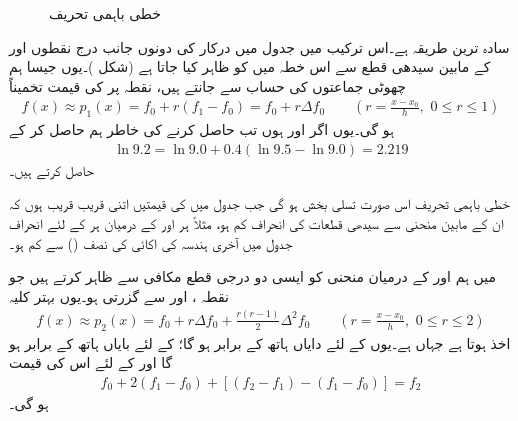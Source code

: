 \begin{figure}
\centering
{}
\caption{خطی باہمی تحریف}
\label{شکل_اعدادی_خطی_باہمی_تحریف}
\end{figure}

سادہ ترین طریقہ  ہے۔اس ترکیب میں جدول میں درکار  کی دونوں جانب درج نقطوں  اور  کے مابین سیدھی قطع سے اس خطہ میں   کو ظاہر کیا جاتا ہے (شکل )۔یوں جیسا ہم چھوٹی جماعتوں کی حساب سے جانتے ہیں، نقطہ  پر  کی قیمت تخمیناً
\begin{align}\label{مساوات_اعدادی_خطی_باہمی_تحریف}
f(x)\approx p_1(x)=f_0+r(f_1-f_0)=f_0+r\Delta f_0\quad \quad (r=\frac{x-x_0}{h},\,\,0\le r\le 1)
\end{align}
ہو گی۔یوں اگر  اور  ہوں تب  حاصل کرنے کی خاطر ہم   حاصل کر کے
\begin{align*}
\ln 9.2=\ln 9.0+0.4(\ln 9.5-\ln 9.0)=2.219
\end{align*}
حاصل کرتے ہیں۔  

خطی باہمی تحریف اس صورت تسلی بخش ہو گی جب جدول میں  کی قیمتیں اتنی قریب قریب ہوں کہ ان کے مابین منحنی سے سیدھی قطعات کی انحراف کم ہو، مثلاً ہر   اور  کے درمیان ہر  کے لئے انحراف جدول میں آخری ہندسہ کی اکائی کی نصف () سے کم ہو۔

 میں ہم  اور  کے درمیان منحنی  کو ایسی دو درجی  قطع مکافی سے ظاہر کرتے ہیں جو نقطہ ،  اور  سے گزرتی ہو۔یوں بہتر کلیہ
\begin{align}\label{مساوات_اعدادی_دو_درجی_باہمی_تحریف}
f(x)\approx p_2(x)=f_0+r\Delta f_0+\frac{r(r-1)}{2}\Delta^2 f_0\quad \quad (r=\frac{x-x_0}{h},\,\, 0\le r\le 2)
\end{align} 
اخذ ہوتا ہے جہاں  ہے۔یوں  کے لئے دایاں ہاتھ  کے برابر ہو گا؛  کے لئے بایاں ہاتھ  کے برابر ہو گا اور  کے لئے اس کی قیمت
\begin{align*}
f_0+2(f_1-f_0)+[(f_2-f_1)-(f_1-f_0)]=f_2
\end{align*}
ہو گی۔

